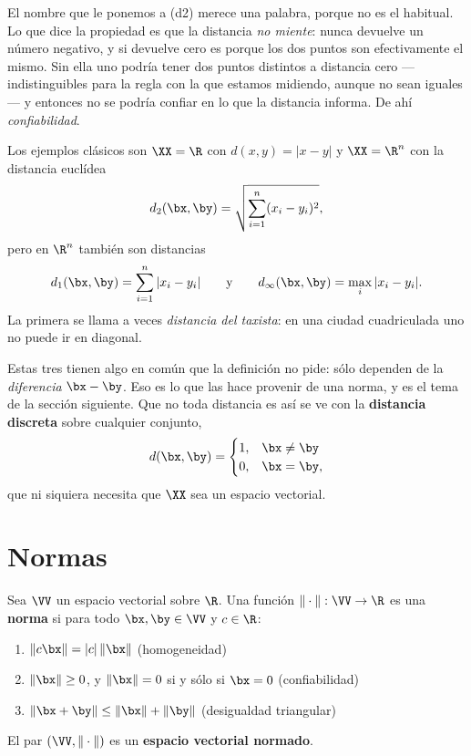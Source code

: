 El nombre que le ponemos a (d2) merece una palabra, porque no es el habitual.
Lo que dice la propiedad es que la distancia \emph{no miente}: nunca devuelve
un número negativo, y si devuelve cero es porque los dos puntos son
efectivamente el mismo. Sin ella uno podría tener dos puntos distintos a
distancia cero ---indistinguibles para la regla con la que estamos midiendo,
aunque no sean iguales--- y entonces no se podría confiar en lo que la
distancia informa. De ahí \emph{confiabilidad}.

Los ejemplos clásicos son $\XX=\R$ con $d(x,y)=|x-y|$ y $\XX=\R^n$ con la
distancia euclídea
\[
d_2(\bx,\by)=\sqrt{\sum_{i=1}^n(x_i-y_i)^2},
\]
pero en $\R^n$ también son distancias
\[
d_1(\bx,\by)=\sum_{i=1}^n|x_i-y_i|
\qquad\text{y}\qquad
d_\infty(\bx,\by)=\max_{i}|x_i-y_i| .
\]
La primera se llama a veces \emph{distancia del taxista}: en una ciudad
cuadriculada uno no puede ir en diagonal.

Estas tres tienen algo en común que la definición no pide: sólo dependen de
la \emph{diferencia} $\bx-\by$. Eso es lo que las hace provenir de una norma,
y es el tema de la sección siguiente. Que no toda distancia es así se ve con
la \textbf{distancia discreta} sobre cualquier conjunto,
\begin{equation}\label{eq:discreta}
d(\bx,\by)=\begin{cases}
  1,&\bx\neq\by\\
  0,&\bx=\by,
\end{cases}
\end{equation}
que ni siquiera necesita que $\XX$ sea un espacio vectorial.

\section{Normas}
\label{sec:normas}

\begin{definition}
Sea $\VV$ un espacio vectorial sobre $\R$. Una función
$\|\cdot\|:\VV\to\R$ es una \textbf{norma} si para todo $\bx,\by\in\VV$ y
$c\in\R$:
\begin{enumerate}[label=\textup{(n\arabic*)}]
\item $\|c\bx\|=|c|\,\|\bx\|$ \hfill (homogeneidad)
\item $\|\bx\|\ge 0$, y $\|\bx\|=0$ si y sólo si $\bx=0$
\hfill (confiabilidad)
\item $\|\bx+\by\|\le\|\bx\|+\|\by\|$ \hfill (desigualdad triangular)
\end{enumerate}
El par $(\VV,\|\cdot\|)$ es un \textbf{espacio vectorial normado}.
\end{definition}

